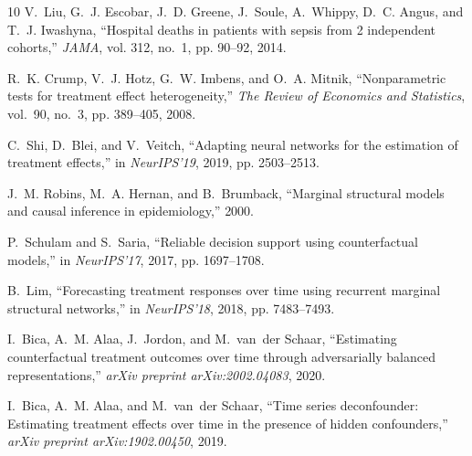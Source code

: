 \documentclass[conference]{IEEEtran}
\begin{document}
\begin{thebibliography}{10}
V.~Liu, G.~J. Escobar, J.~D. Greene, J.~Soule, A.~Whippy, D.~C. Angus, and
  T.~J. Iwashyna, ``Hospital deaths in patients with sepsis from 2 independent
  cohorts,'' \emph{JAMA}, vol. 312, no.~1, pp. 90--92, 2014.

R.~K. Crump, V.~J. Hotz, G.~W. Imbens, and O.~A. Mitnik, ``Nonparametric tests
  for treatment effect heterogeneity,'' \emph{The Review of Economics and
  Statistics}, vol.~90, no.~3, pp. 389--405, 2008.

C.~Shi, D.~Blei, and V.~Veitch, ``Adapting neural networks for the estimation
  of treatment effects,'' in \emph{NeurIPS'19}, 2019, pp. 2503--2513.

J.~M. Robins, M.~A. Hernan, and B.~Brumback, ``Marginal structural models and
  causal inference in epidemiology,'' 2000.

P.~Schulam and S.~Saria, ``Reliable decision support using counterfactual
  models,'' in \emph{NeurIPS'17}, 2017, pp. 1697--1708.

B.~Lim, ``Forecasting treatment responses over time using recurrent marginal
  structural networks,'' in \emph{NeurIPS'18}, 2018, pp. 7483--7493.

I.~Bica, A.~M. Alaa, J.~Jordon, and M.~van~der Schaar, ``Estimating
  counterfactual treatment outcomes over time through adversarially balanced
  representations,'' \emph{arXiv preprint arXiv:2002.04083}, 2020.

I.~Bica, A.~M. Alaa, and M.~van~der Schaar, ``Time series deconfounder:
  Estimating treatment effects over time in the presence of hidden
  confounders,'' \emph{arXiv preprint arXiv:1902.00450}, 2019.

\end{thebibliography}
\end{document}
